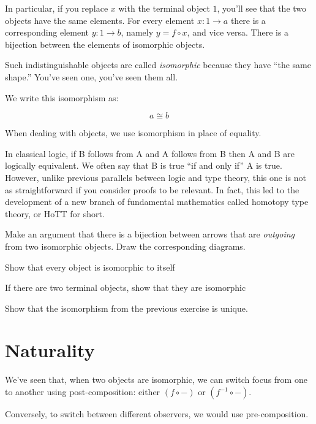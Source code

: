 \documentclass[DaoFP]{subfiles}
\begin{document}
In particular, if you replace $x$ with the terminal object $1$, you'll see that the two objects have the same elements. For every element $x \colon 1 \to a$ there is a corresponding element $y \colon 1 \to b$, namely $y = f \circ x$, and vice versa. There is a bijection between the elements of isomorphic objects.

Such indistinguishable objects are called \emph{isomorphic} because they have ``the same shape.'' You've seen one, you've seen them all. 

We write this isomorphism as:

\[a \cong b\]

When dealing with objects, we use isomorphism in place of equality.

In classical logic, if B follows from A and A follows from B then A and B are logically equivalent. We often say that B is true ``if and only if'' A is true. However, unlike previous parallels between logic and type theory, this one is not as straightforward if you consider proofs to be relevant. In fact, this led to the development of a new branch of fundamental mathematics called homotopy type theory, or HoTT for short.

\begin{exercise}
Make an argument that there is a bijection between arrows that are \emph{outgoing} from two isomorphic objects. Draw the corresponding diagrams.
\end{exercise}


\begin{exercise}
Show that every object is isomorphic to itself
\end{exercise}

\begin{exercise}
If there are two terminal objects, show that they are isomorphic
\end{exercise}

\begin{exercise}
Show that the isomorphism from the previous exercise is unique.
\end{exercise}

\section{Naturality}

We've seen that, when two objects are isomorphic, we can switch focus from one to another using post-composition: either $(f \circ -)$ or $(f^{-1} \circ -)$. 

Conversely, to switch between different observers, we would use pre-composition. 
\end{document}
